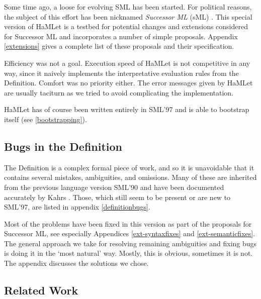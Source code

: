 \documentclass[twoside,titlepage]{article}
\newcommand{\void}[1]{}
\begin{document}
Some time ago, a loose for evolving SML has been started. For political reasons, the subject of this effort has been nicknamed {\em Successor ML} (sML) \cite{successorml}. This special version of HaMLet is a testbed for potential changes and extensions considered for Successor ML and incorporates a number of simple proposals. Appendix \ref{extensions} gives a complete list of these proposals and their specification.

Efficiency was not a goal. Execution speed of HaMLet is not competitive in any way, since it naively implements the interpretative evaluation rules from the Definition. Comfort was no priority either. The error messages given by HaMLet are usually taciturn as we tried to avoid complicating the implementation.

HaMLet has of course been written entirely in SML'97 and is able to bootstrap itself (see \ref{bootstrapping}).


\subsection{Bugs in the Definition}
\label{definitionbugsoverview}

The Definition is a complex formal piece of work, and so it is unavoidable that it contains several mistakes, ambiguities, and omissions. Many of these are inherited from the previous language version SML'90 \cite{definition90} and have been documented accurately by Kahrs \cite{mistakes, addenda}. Those, which still seem to be present or are new to SML'97, are listed in appendix \ref{definitionbugs}.

Most of the problems have been fixed in this version as part of the proposals for Successor ML, see especially Appendices \ref{ext-syntaxfixes} and \ref{ext-semanticfixes}.
The general approach we take for resolving remaining ambiguities and fixing bugs is doing it in the `most natural' way. Mostly, this is obvious, sometimes it is not.\void{ Moreover, in cases where the Definition allows implementations some freedom (e.g.\ the choice of context taken into account to resolve overloading) we choose the most restrictive view, so that HaMLet only accepts those programs that ought to be portable across all possible implementations.} The appendix discusses the solutions we chose.


\subsection{Related Work}
\label{related}
\end{document}
